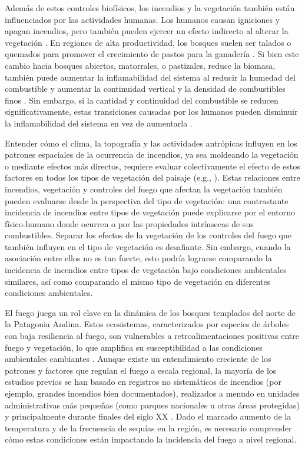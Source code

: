 Además de estos controles biofísicos, los incendios y la vegetación también están influenciados por las actividades humanas. Los humanos causan igniciones y apagan incendios, pero también pueden ejercer un efecto indirecto al alterar la vegetación \citep{bowman_human_2011, bar-massada_biotic_2014}. En regiones de alta productividad, los bosques suelen ser talados o quemados para promover el crecimiento de pastos para la ganadería \citep{curtis_classifying_2018}. Si bien este cambio hacia bosques abiertos, matorrales, o pastizales, reduce la biomasa, también puede aumentar la inflamabilidad del sistema al reducir la humedad del combustible y aumentar la continuidad vertical y la densidad de combustibles finos \citep{pausas_global_2013}. Sin embargo, si la cantidad y continuidad del combustible se reducen significativamente, estas transiciones causadas por los humanos pueden disminuir la inflamabilidad del sistema en vez de aumentarla \citep{blackhall_effects_2017}.

Entender cómo el clima, la topografía y las actividades antrópicas influyen en los patrones espaciales de la ocurrencia de incendios, ya sea moldeando la vegetación o mediante efectos más directos, requiere evaluar colectivamente el efecto de estos factores en todos los tipos de vegetación del paisaje (e.g., \citealt{wood_firescape_2011}). Estas relaciones entre incendios, vegetación y controles del fuego que afectan la vegetación también pueden evaluarse desde la perspectiva del tipo de vegetación: una contrastante incidencia de incendios entre tipos de vegetación puede explicarse por el entorno físico-humano donde ocurren o por las propiedades intrínsecas de sus combustibles. Separar los efectos de la vegetación de los controles del fuego que también influyen en el tipo de vegetación es desafiante. Sin embargo, cuando la asociación entre ellos no es tan fuerte, esto podría lograrse comparando la incidencia de incendios entre tipos de vegetación bajo condiciones ambientales similares, así como comparando el mismo tipo de vegetación en diferentes condiciones ambientales.

El fuego juega un rol clave en la dinámica de los bosques templados del norte de la Patagonia Andina. Estos ecosistemas, caracterizados por especies de árboles con baja resiliencia al fuego, son vulnerables a retroalimentaciones positivas entre fuego y vegetación, lo que amplifica su susceptibilidad a las condiciones ambientales cambiantes \citep{kitzberger_decreases_2012, kitzberger_firevegetation_2016, kitzberger_projections_2022}. Aunque existe un entendimiento creciente de los patrones y factores que regulan el fuego a escala regional, la mayoría de los estudios previos se han basado en registros no sistemáticos de incendios (por ejemplo, grandes incendios bien documentados), realizados a menudo en unidades administrativas más pequeñas (como parques nacionales u otras áreas protegidas) y principalmente durante finales del siglo XX \citep{mermoz_landscape_2005, de_torres_curth_incendios_2008, holz_ecological_2012, mundo_environmental_2013, paritsis_habitat_2013}. Dado el marcado aumento de la temperatura y de la frecuencia de sequías en la región, es necesario comprender cómo estas condiciones están impactando la incidencia del fuego a nivel regional.

